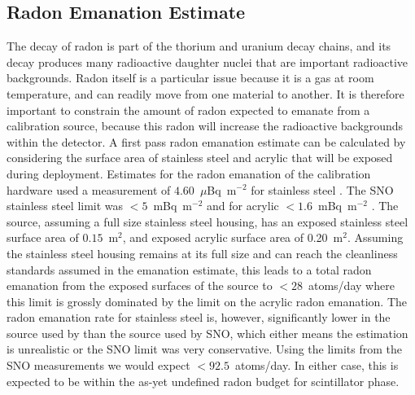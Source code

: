 \subsection{Radon Emanation Estimate}
\label{sec:emanation}
The decay of radon is part of the thorium and uranium decay chains, and its decay produces many radioactive daughter nuclei that are important radioactive backgrounds.
Radon itself is a particular issue because it is a gas at room temperature, and can readily move from one material to another.
It is therefore important to constrain the amount of radon expected to emanate from a calibration source, because this radon will increase the radioactive backgrounds within the detector.
A first pass radon emanation estimate can be calculated by considering the surface area of stainless steel and acrylic that will be exposed during deployment. 
Estimates for the radon emanation of the {\snop} calibration hardware used a measurement of $4.60$~$\mu$Bq~m$^{-2}$ for stainless steel \cite{kormos:2015}. 
The SNO stainless steel limit was $< 5$~mBq~m$^{-2}$ and for acrylic $< 1.6$~mBq~m$^{-2}$ \cite{Liu:1993}. 
The source, assuming a full size stainless steel housing, has an exposed stainless steel surface area of $0.15$~m$^2$, and exposed acrylic surface area of 0.20~m$^2$. 
Assuming the stainless steel housing remains at its full size and can reach the cleanliness standards assumed in the {\snop} emanation estimate, this leads to a total radon emanation from the exposed surfaces of the source to $<28$~atoms/day where this limit is grossly dominated by the limit on the acrylic radon emanation. 
The radon emanation rate for stainless steel is, however, significantly lower in the source used by {\snop} than the source used by SNO, which either means the {\snop} estimation is unrealistic or the SNO limit was very conservative. 
Using the limits from the SNO measurements we would expect $<92.5$~atoms/day.
In either case, this is expected to be within the as-yet undefined {\snop} radon budget for scintillator phase.

